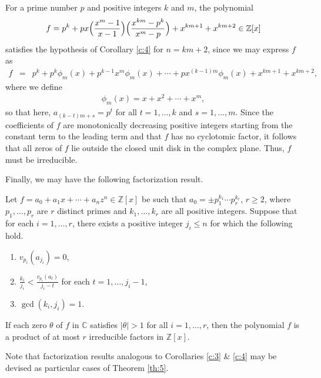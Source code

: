 \documentclass[12pt]{amsart}%
\begin{document}
\begin{example}
For a prime number $p$  and positive integers $k$ and $m$, the polynomial
\begin{eqnarray*}
f= p^k+px\Bigl(\frac{x^m-1}{x-1}\Bigr) \Bigl(\frac{x^{km}-p^k}{x^m-p}\Bigr)+x^{km+1}+x^{km+2}\in \mathbb{Z}[x]
\end{eqnarray*}
satisfies the hypothesis of Corollary \ref{c:4} for $n=km+2$, since we may express $f$ as
\begin{eqnarray*}
f&=&p^k+p^k\phi_{m}(x)+p^{k-1}x^m \phi_m(x)+\cdots+px^{(k-1)m}\phi_m(x)+x^{km+1}+x^{km+2},
\end{eqnarray*}
where we define
\begin{eqnarray*}
\phi_m(x)=x+x^2+\cdots+x^m,
\end{eqnarray*}
so that here, $a_{(k-t)m+s}=p^t$ for all $t=1,\ldots,k$ and $s=1,\ldots, m$. Since the coefficients of $f$ are monotonically decreasing positive integers starting from the constant term to the leading term and that $f$ has no cyclotomic factor, it follows  that all zeros of $f$ lie outside the closed unit disk in the complex plane. Thus, $f$ must be irreducible.
\end{example}
Finally, we may have the following factorization result.
\begin{theorem}\label{th:5}
Let $f=a_0+a_1 x +\cdots+a_nz^n\in \mathbb{Z}[x]$ be such that $a_0=\pm p_1^{k_1}\cdots p_r^{k_r}$, $r\geq 2$, where $p_1, \ldots, p_r$ are $r$ distinct primes and $k_1,\ldots,k_r$ are all positive integers. Suppose that for each $i=1,\ldots, r$, there exists  a positive integer $j_i\leq n$ for which the following hold.
\begin{enumerate}
\item[(i)] $v_{p_i}(a_{j_i})=0$,
\item[(ii)] $\frac{k_i}{j_i}<\frac{v_{p_i}(a_t)}{j_i-t}$ for each $t=1,\ldots,j_i-1$,
\item[(iii)] $\gcd(k_i,j_i)=1$.
\end{enumerate}
If each zero $\theta$ of $f$ in $\mathbb{C}$ satisfies $|\theta|>1$ for all $i=1,\ldots, r$, then  the polynomial $f$ is a product of at most $r$ irreducible factors in $\mathbb{Z}[x]$.
\end{theorem}
Note that factorization results analogous to Corollaries \ref{c:3} \& \ref{c:4} may be devised as particular cases of  Theorem \ref{th:5}.
\end{document}

